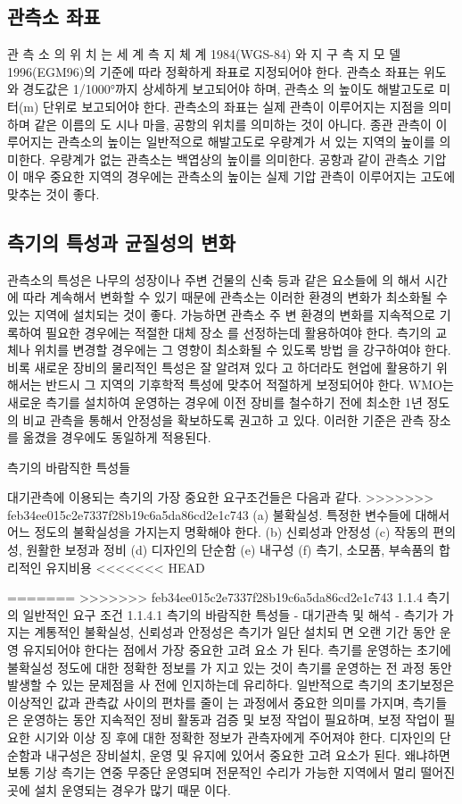 \begin{itemize}
\subsection{관측소 좌표}
관 측 소 의 위 치 는 세 계 측 지 체 계 1984(WGS-84) 와 지 구 측 지 모 델
1996(EGM96)의 기준에 따라 정확하게 좌표로 지정되어야 한다. 관측소
좌표는 위도와 경도값은 1/1000°까지 상세하게 보고되어야 하며, 관측소
의 높이도 해발고도로 미터(m) 단위로 보고되어야 한다.
관측소의 좌표는 실제 관측이 이루어지는 지점을 의미하며 같은 이름의 도
시나 마을, 공항의 위치를 의미하는 것이 아니다. 종관 관측이 이루어지는
관측소의 높이는 일반적으로 해발고도로 우량계가 서 있는 지역의 높이를
의미한다. 우량계가 없는 관측소는 백엽상의 높이를 의미한다. 공항과 같이
관측소 기압이 매우 중요한 지역의 경우에는 관측소의 높이는 실제 기압
관측이 이루어지는 고도에 맞추는 것이 좋다.

\subsection{측기의 특성과 균질성의 변화}
관측소의 특성은 나무의 성장이나 주변 건물의 신축 등과 같은 요소들에 의
해서 시간에 따라 계속해서 변화할 수 있기 때문에 관측소는 이러한 환경의
변화가 최소화될 수 있는 지역에 설치되는 것이 좋다. 가능하면 관측소 주
변 환경의 변화를 지속적으로 기록하여 필요한 경우에는 적절한 대체 장소
를 선정하는데 활용하여야 한다.
측기의 교체나 위치를 변경할 경우에는 그 영향이 최소화될 수 있도록 방법
을 강구하여야 한다. 비록 새로운 장비의 물리적인 특성은 잘 알려져 있다
고 하더라도 현업에 활용하기 위해서는 반드시 그 지역의 기후학적 특성에
맞추어 적절하게 보정되어야 한다.
WMO는 새로운 측기를 설치하여 운영하는 경우에 이전 장비를 철수하기
전에 최소한 1년 정도의 비교 관측을 통해서 안정성을 확보하도록 권고하
고 있다. 이러한 기준은 관측 장소를 옮겼을 경우에도 동일하게 적용된다.

측기의 바람직한 특성들

대기관측에 이용되는 측기의 가장 중요한 요구조건들은 다음과 같다.
>>>>>>> feb34ee015c2e7337f28b19c6a5da86cd2e1c743
(a) 불확실성. 특정한 변수들에 대해서 어느 정도의 불확실성을 가지는지
명확해야 한다.
(b) 신뢰성과 안정성
(c) 작동의 편의성, 원활한 보정과 정비
(d) 디자인의 단순함
(e) 내구성
(f) 측기, 소모품, 부속품의 합리적인 유지비용
<<<<<<< HEAD


=======
>>>>>>> feb34ee015c2e7337f28b19c6a5da86cd2e1c743
1.1.4 측기의 일반적인 요구 조건
1.1.4.1 측기의 바람직한 특성들
- 대기관측 및 해석
-
측기가 가지는 계통적인 불확실성, 신뢰성과 안정성은 측기가 일단 설치되
면 오랜 기간 동안 운영 유지되어야 한다는 점에서 가장 중요한 고려 요소
가 된다. 측기를 운영하는 초기에 불확실성 정도에 대한 정확한 정보를 가
지고 있는 것이 측기를 운영하는 전 과정 동안 발생할 수 있는 문제점을 사
전에 인지하는데 유리하다.
일반적으로 측기의 초기보정은 이상적인 값과 관측값 사이의 편차를 줄이
는 과정에서 중요한 의미를 가지며, 측기들은 운영하는 동안 지속적인 정비
활동과 검증 및 보정 작업이 필요하며, 보정 작업이 필요한 시기와 이상 징
후에 대한 정확한 정보가 관측자에게 주어져야 한다.
디자인의 단순함과 내구성은 장비설치, 운영 및 유지에 있어서 중요한 고려
요소가 된다. 왜냐하면 보통 기상 측기는 연중 무중단 운영되며 전문적인
수리가 가능한 지역에서 멀리 떨어진 곳에 설치 운영되는 경우가 많기 때문
이다.


\end{itemize}
